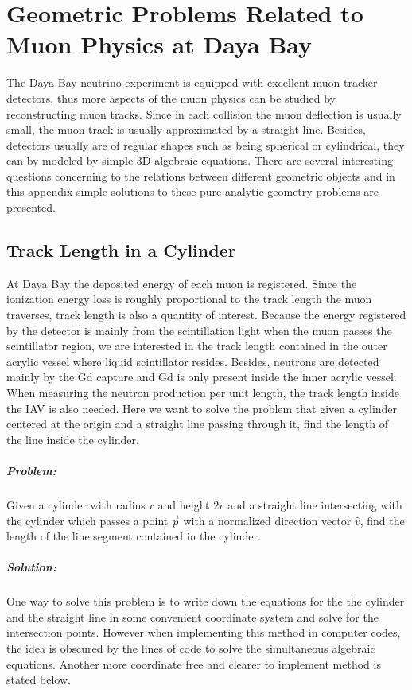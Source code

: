 \chapter{Geometric Problems Related to Muon Physics at Daya Bay}\label{app:a}
The Daya Bay neutrino experiment is equipped with excellent muon tracker detectors, thus more aspects of the muon physics can be studied by reconstructing muon tracks. Since in each collision the muon deflection is usually small, the muon track is usually approximated by a straight line. Besides, detectors usually are of regular shapes such as being spherical or cylindrical, they can by modeled by simple 3D algebraic equations. There are several interesting questions concerning to the relations between different geometric objects and in this appendix simple solutions to these pure analytic geometry problems are presented.

\section{Track Length in a Cylinder}
At Daya Bay the deposited energy of each muon is registered. Since the ionization energy loss is roughly proportional to the track length the muon traverses, track length is also a quantity of interest. Because the energy registered by the detector is mainly from the scintillation light when the muon passes the scintillator region, we are interested in the track length contained in the outer acrylic vessel where liquid scintillator resides. Besides, neutrons are detected mainly by the Gd capture and Gd is only present inside the inner acrylic vessel. When measuring the neutron production per unit length, the track length inside the IAV is also needed. Here we want to solve the problem that given a cylinder centered at the origin and a straight line passing through it, find the length of the line inside the cylinder.

\paragraph{Problem:}Given a cylinder with radius $r$ and height $2r$ and a straight line intersecting with the cylinder which passes a point $\vec{p}$ with a normalized direction vector $\hat{v}$, find the length of the line segment contained in the cylinder.

\paragraph{Solution:}
One way to solve this problem is to write down the equations for the the cylinder and the straight line in some convenient coordinate system and solve for the intersection points. However when implementing this method in computer codes, the idea is obscured by the lines of code to solve the simultaneous algebraic equations. Another more coordinate free and clearer to implement method is stated below.

